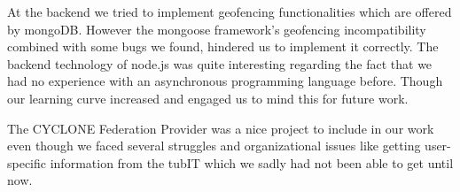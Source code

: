 At the backend we tried to implement geofencing functionalities which are offered by mongoDB. However the mongoose framework's geofencing incompatibility combined with some bugs we found, hindered us to implement it correctly. The backend technology of node.js was quite interesting regarding the fact that we had no experience with an asynchronous programming language before. Though our learning curve increased and engaged us to mind this for future work. 

The CYCLONE Federation Provider was a nice project to include in our work even though we faced several struggles and organizational issues like getting user-specific information from the tubIT which we sadly had not been able to get until now.

